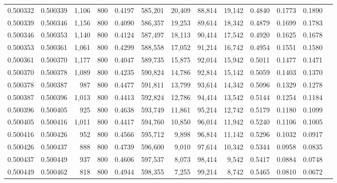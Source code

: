 \begin{tabular}{rrrrrrrrrrrrr}
0.500332 & 0.500339 &  1,106 &   800 &                                     0.4197 & 585,201 &  20,409 &  88,814 &  19,142 & 0.4840 & 0.1773 & 0.1890 \\
0.500339 & 0.500346 &  1,156 &   800 &                                     0.4090 & 586,357 &  19,253 &  89,614 &  18,342 & 0.4879 & 0.1699 & 0.1783 \\
0.500346 & 0.500353 &  1,140 &   800 &                                     0.4124 & 587,497 &  18,113 &  90,414 &  17,542 & 0.4920 & 0.1625 & 0.1678 \\
0.500353 & 0.500361 &  1,061 &   800 &                                     0.4299 & 588,558 &  17,052 &  91,214 &  16,742 & 0.4954 & 0.1551 & 0.1580 \\
0.500361 & 0.500370 &  1,177 &   800 &                                     0.4047 & 589,735 &  15,875 &  92,014 &  15,942 & 0.5011 & 0.1477 & 0.1471 \\
0.500370 & 0.500378 &  1,089 &   800 &                                     0.4235 & 590,824 &  14,786 &  92,814 &  15,142 & 0.5059 & 0.1403 & 0.1370 \\
0.500378 & 0.500387 &    987 &   800 &                                     0.4477 & 591,811 &  13,799 &  93,614 &  14,342 & 0.5096 & 0.1329 & 0.1278 \\
0.500387 & 0.500396 &  1,013 &   800 &                                     0.4413 & 592,824 &  12,786 &  94,414 &  13,542 & 0.5144 & 0.1254 & 0.1184 \\
0.500396 & 0.500405 &    925 &   800 &                                     0.4638 & 593,749 &  11,861 &  95,214 &  12,742 & 0.5179 & 0.1180 & 0.1099 \\
0.500405 & 0.500416 &  1,011 &   800 &                                     0.4417 & 594,760 &  10,850 &  96,014 &  11,942 & 0.5240 & 0.1106 & 0.1005 \\
0.500416 & 0.500426 &    952 &   800 &                                     0.4566 & 595,712 &   9,898 &  96,814 &  11,142 & 0.5296 & 0.1032 & 0.0917 \\
0.500426 & 0.500437 &    888 &   800 &                                     0.4739 & 596,600 &   9,010 &  97,614 &  10,342 & 0.5344 & 0.0958 & 0.0835 \\
0.500437 & 0.500449 &    937 &   800 &                                     0.4606 & 597,537 &   8,073 &  98,414 &   9,542 & 0.5417 & 0.0884 & 0.0748 \\
0.500449 & 0.500462 &    818 &   800 &                                     0.4944 & 598,355 &   7,255 &  99,214 &   8,742 & 0.5465 & 0.0810 & 0.0672 \\

\end{tabular}
